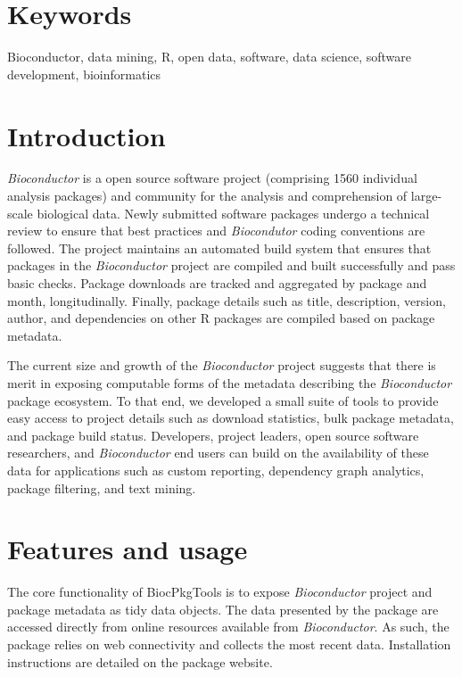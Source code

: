 \documentclass[9pt,a4paper]{extarticle}\usepackage[]{graphicx}\usepackage[]{color}
\begin{document}
\section*{Keywords}

Bioconductor, data mining, R, open data, software, data science, software development, bioinformatics






\clearpage
\pagestyle{main}

\section*{Introduction}

\emph{Bioconductor} is a open source software project (comprising
1560 individual analysis packages) and community for
the analysis and comprehension of large-scale biological data. Newly
submitted software packages undergo a technical review to ensure that
best practices and \emph{Biocondutor} coding conventions are
followed. The project maintains an automated build system that ensures
that packages in the \emph{Bioconductor} project are compiled and
built successfully and pass basic checks. Package downloads are
tracked and aggregated by package and month, longitudinally. Finally,
package details such as title, description, version, author, and
dependencies on other R packages are compiled based on package
metadata.

The current size and growth of the \emph{Bioconductor} project suggests that
there is merit in exposing computable forms of the metadata describing
the \emph{Bioconductor} package ecosystem. To that end, we developed a small
suite of tools to provide easy access to project details such as download
statistics, bulk package metadata, and package build
status. Developers, project leaders, open source software researchers,
and \emph{Bioconductor} end users can build on the availability of these data
for applications such as custom reporting, dependency graph analytics,
package filtering, and text mining.


\section*{Features and usage}

The core functionality of BiocPkgTools is to expose
\emph{Bioconductor} project and package metadata as tidy data
\citep{Wickham2014-ye} objects. The data presented by the package are
accessed directly from online resources available from
\emph{Bioconductor}. As such, the package relies on web connectivity and
collects the most recent data. Installation instructions are detailed
on the package website.
\end{document}

